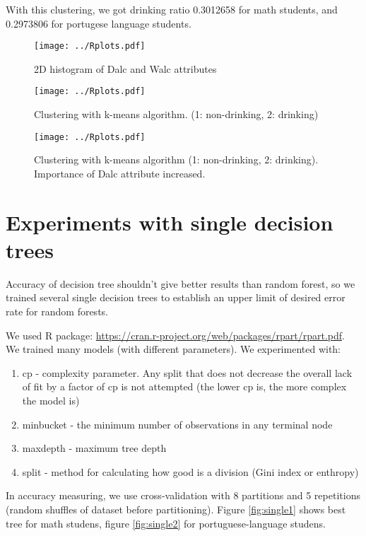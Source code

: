 \documentclass[a4paper]{article}
\begin{document}
With this clustering, we got drinking ratio 0.3012658 for math students,
and 0.2973806 for portugese language students.




\begin{figure}[H]
    \caption[]{2D histogram of Dalc and Walc attributes}
    \centering
    \texttt{[image: ../Rplots.pdf]}
    \label{fig:hist2D}
\end{figure}

\begin{figure}[H]
    \caption[]{Clustering with k-means algorithm. (1: non-drinking, 2: drinking)}
    \centering
    \texttt{[image: ../Rplots.pdf]}
    \label{fig:clust}
\end{figure}

\begin{figure}[H]
    \caption[]{Clustering with k-means algorithm (1: non-drinking, 2: drinking). Importance of Dalc attribute increased.}
    \centering
    \texttt{[image: ../Rplots.pdf]}
    \label{fig:clust2}
\end{figure}

\newpage
\section{Experiments with single decision trees}
\label{expSingle}

Accuracy of decision tree shouldn't give better results than random forest,
so we trained several single decision trees to establish
an upper limit of desired error rate for random forests.

We used R package: \url{https://cran.r-project.org/web/packages/rpart/rpart.pdf}.
We trained many models (with different parameters).
We experimented with:
\begin{enumerate}
    \item cp - complexity parameter.
        Any split that does not decrease the overall lack of fit by a factor of cp is not attempted
        (the lower cp is, the more complex the model is)
    \item minbucket - the minimum number of observations in any terminal node
    \item maxdepth - maximum tree depth
    \item split - method for calculating how good is a division (Gini index or enthropy)
\end{enumerate}
In accuracy measuring, we use cross-validation with 8 partitions
and 5 repetitions (random shuffles of dataset before partitioning).
Figure \ref{fig:single1} shows best tree for math studens,
figure \ref{fig:single2} for portuguese-language studens.
\end{document}
